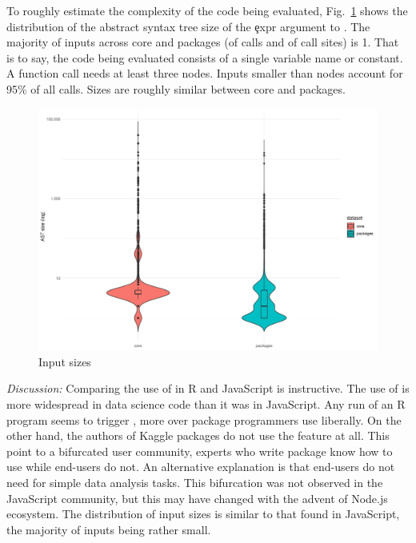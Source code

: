 \documentclass[conference]{IEEEtran}
\begin{document}
\begin{table}[ht]
\caption{Distribution of callsites in CRAN}
\label{table:site-package-summary}
\end{table}

To roughly estimate the complexity of the code being evaluated,
Fig.~\ref{fig:ast-size} shows the distribution of the abstract syntax tree
size of the \c{expr} argument to \eval. The majority of inputs across core
and packages (\NbAstOnePercent of \eval calls and \NbAstOneCallSitePercent of call sites) is 1. That is to say, the code being evaluated
consists of a single variable name or constant. A function call needs at
least three nodes. Inputs smaller than \AstSizeNineFive nodes account for 95\% of all
calls. Sizes are roughly similar between core and packages.

\begin{figure}[htbp]
	\centering
\includegraphics[width=\columnwidth]{ast_sizes}
\caption{Input sizes} \label{fig:ast-size}
\end{figure}

\medskip\noindent\emph{Discussion:} Comparing the use of \eval in R and
JavaScript is instructive. The use of \eval is more widespread in data
science code than it was in JavaScript. Any run of an R program seems to
trigger \eval, more over package programmers use \eval liberally. On the
other hand, the authors of Kaggle packages do not use the feature at all.
This point to a bifurcated user community, experts who write package know
how to use \eval while end-users do not. An alternative explanation is that
end-users do not need \eval for simple data analysis tasks. This bifurcation
was not observed in the JavaScript community, but this may have changed with
the advent of Node.js ecosystem.  The distribution of input sizes is similar
to that found in JavaScript, the majority of inputs being rather small.
\end{document}
